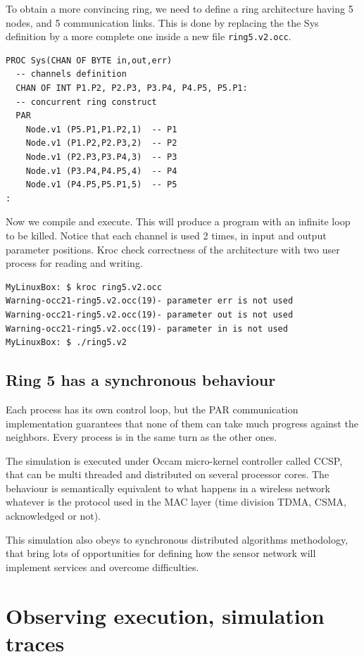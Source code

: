 \documentclass[times]{book}
\begin{document}
To obtain a more convincing ring, we need to define a ring architecture having
5 nodes, and 5 communication links.
This is done by replacing the the Sys definition by a more complete one
inside a new file  {\tt ring5.v2.occ}.


\begin{lstlisting}  
PROC Sys(CHAN OF BYTE in,out,err)
  -- channels definition
  CHAN OF INT P1.P2, P2.P3, P3.P4, P4.P5, P5.P1:
  -- concurrent ring construct
  PAR
    Node.v1 (P5.P1,P1.P2,1)  -- P1
    Node.v1 (P1.P2,P2.P3,2)  -- P2
    Node.v1 (P2.P3,P3.P4,3)  -- P3
    Node.v1 (P3.P4,P4.P5,4)  -- P4
    Node.v1 (P4.P5,P5.P1,5)  -- P5
:
\end{lstlisting} 

Now we compile and execute. This will produce a program with an infinite loop
to be killed. Notice that each channel is used 2 times,  in   input and output parameter
positions. Kroc check correctness of the architecture with two user process for
reading and writing.

\begin{lstlisting}  
MyLinuxBox: $ kroc ring5.v2.occ
Warning-occ21-ring5.v2.occ(19)- parameter err is not used
Warning-occ21-ring5.v2.occ(19)- parameter out is not used
Warning-occ21-ring5.v2.occ(19)- parameter in is not used
MyLinuxBox: $ ./ring5.v2
\end{lstlisting} 

\subsection {Ring 5 has a synchronous behaviour}

Each process has its own control loop, but the PAR communication implementation
guarantees that none of them can take much progress against the neighbors. Every 
process is in the same turn as the other ones.

The simulation is executed under Occam micro-kernel controller called CCSP,
that can be multi threaded and distributed on several processor cores.
The behaviour is semantically equivalent to what happens in a wireless network
whatever is the protocol used in the MAC layer (time division TDMA, CSMA,
acknowledged or not).

This simulation also obeys to synchronous distributed algorithms methodology,
that bring lots of opportunities for defining how the sensor network will
implement services and overcome difficulties.

\section{Observing execution, simulation traces}
\end{document}
